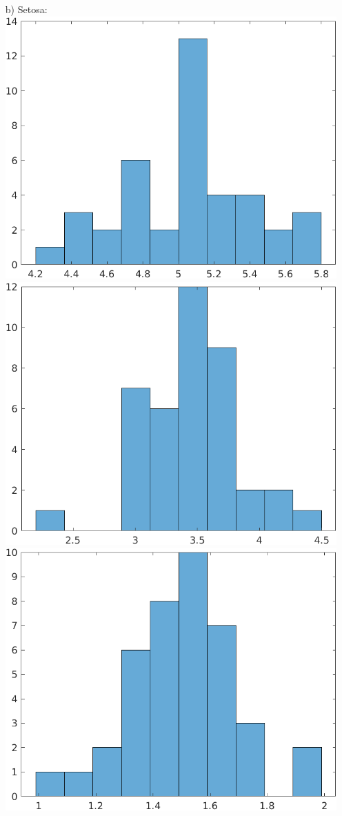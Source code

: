 \documentclass[a4paper]{scrartcl}
\begin{document}
\begin{itemize}
	\item[b)] Setosa:\\
		\includegraphics*[scale=0.2]{assignment2_data/plots/setosa_sl.png}
		\includegraphics*[scale=0.2]{assignment2_data/plots/setosa_sb.png}
		\includegraphics*[scale=0.2]{assignment2_data/plots/setosa_pb.png}

\end{itemize}
\end{document}
